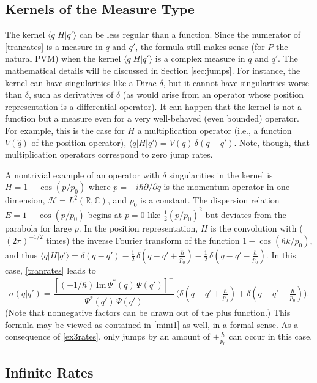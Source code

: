 \documentclass[12pt]{article}
\newcommand{\CCC}{\mathbb{C}} %
\newcommand{\RRR}{\mathbb{R}} %
\newcommand{\I}{i} %
\newcommand{\1}{\mathbf{1}} %
\renewcommand{\Im}{\mathrm{Im}} %
\newcommand{\Hilbert}{\mathscr{H}}
\renewcommand{\sp}[2]{\langle #1 | #2 \rangle} %
\begin{document}
\subsection{Kernels of the Measure Type}\label{sec:ex3}

The kernel $\sp{q}{H|q'}$ can be less regular than a function.  Since 
the
numerator of \eqref{tranrates} is a measure in $q$ and $q'$, the formula
still makes sense (for $P$ the natural PVM)  when the kernel
$\sp{q}{H|q'}$ is a complex measure in $q$ and $q'$. The mathematical
details will be discussed in Section \ref{sec:jumps}. For instance, the
kernel can have singularities like a Dirac $\delta$, but it cannot have
singularities worse than $\delta$, such as derivatives of $\delta$ (as
would arise from an operator whose position representation is a
differential operator).  It can happen that the kernel is not a function
but a measure even for a very well-behaved (even bounded) operator. For
example,  this is the case for $H$  a multiplication operator (i.e., a
function $V(\hat{q})$ of the position operator), $\sp{q}{H|q'} = V(q) \,
\delta(q-q')$. Note, though, that multiplication operators correspond to
zero jump rates.

A nontrivial example of an operator with $\delta$ singularities in the
kernel is $H = 1-\cos (p/p_0)$ where $p= -\I\hbar \partial/\partial q$
is the momentum operator in one dimension, $\Hilbert =
L^2(\RRR,\CCC)$, and $p_0$ is  a constant. The dispersion relation $E =
1-\cos (p/p_0)$ begins at $p=0$ like $\frac{1}{2}(p/p_0)^2$ but
deviates from the parabola for large $p$. In the position
representation, $H$ is the convolution with ($(2\pi)^{-1/2}$ times)
the inverse Fourier transform of the function $1-\cos (\hbar k/p_0)$,
and thus $\sp{q}{H|q'} = \delta(q-q') - \frac{1}{2} \, \delta(q-q'+
\frac{\hbar}{p_0}) -\frac{1}{2} \, \delta(q-q'- \frac{\hbar}{p_0})$. In
this case, \eqref{tranrates} leads to
\begin{equation}\label{ex3rates}
   \sigma(q|q') = \frac{[(-1/\hbar) \, \Im \, \Psi^*(q) \,
   \Psi(q')]^+}{\Psi^*(q') \, \Psi(q')} \, \Big(
   \delta(q-q'+\tfrac{\hbar}{p_0}) + \delta(q-q'- \tfrac{\hbar}{p_0})
   \Big).
\end{equation}
(Note that nonnegative factors can be drawn out of the plus function.)
This formula may be viewed as contained in \eqref{mini1} as well, in a
formal sense.  As a consequence of \eqref{ex3rates}, only jumps by an
amount of $\pm \frac{\hbar}{p_0}$ can occur in this case.


\subsection{Infinite Rates}\label{sec:inftyrates}
\end{document}
